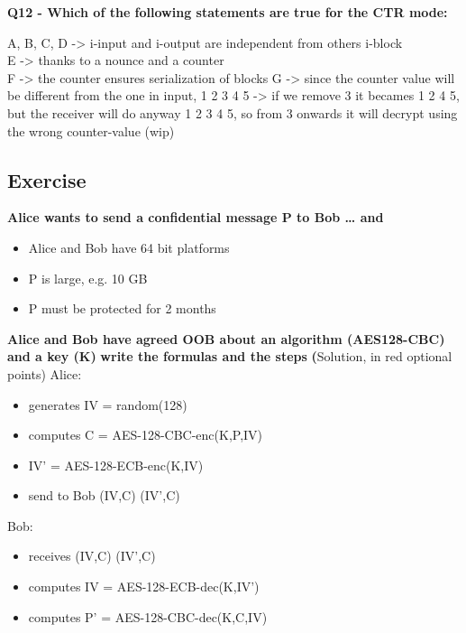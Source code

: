 \textbf{Q12 - Which of the following statements are true for the CTR mode:}
\textcolor{Comment}{
    A, B, C, D -> i-input and i-output are independent from others i-block\\
    E -> thanks to a nounce and a counter\\
    F -> the counter ensures serialization of blocks
    G -> since the counter value will be different from the one in input,  1 2 3 4 5 -> if we remove 3 it becames 1 2 4 5, but the receiver will do 
    anyway 1 2 3 4 5, so from 3 onwards it  will decrypt using the wrong counter-value (wip)
}

\subsection*{Exercise}
\textbf{Alice wants to send a confidential message P to Bob … and}
\begin{itemize}
    \item Alice and Bob have 64 bit platforms
    \item P is large, e.g. 10 GB
    \item P must be protected for 2 months    
\end{itemize}    

\textbf{Alice and Bob have agreed OOB about an algorithm (AES128-CBC) and a key (K)}
\textbf{write the formulas and the steps}
\textbf(Solution, in red optional points)
Alice: 
\begin{itemize}
    \item generates IV = random(128)
    \item computes C = AES-128-CBC-enc(K,P,IV)
    \item \textcolor{Comment}{IV' = AES-128-ECB-enc(K,IV)}
    \item send to Bob (IV,C) \textcolor{Comment}{(IV',C)}
\end{itemize}
Bob: 
\begin{itemize}
    \item receives (IV,C) \textcolor{Comment}{(IV',C)}
    \item \textcolor{Comment}{computes IV = AES-128-ECB-dec(K,IV')} 
    \item computes P' = AES-128-CBC-dec(K,C,IV)
\end{itemize}


